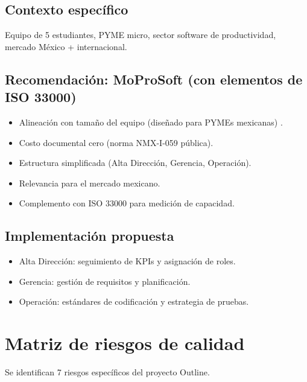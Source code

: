 \documentclass[12pt]{article}
\begin{document}
\subsection{Contexto específico}
Equipo de 5 estudiantes, PYME micro, sector software de productividad, mercado México + internacional.

\subsection{Recomendación: MoProSoft (con elementos de ISO 33000)}
\begin{itemize}
    \item Alineación con tamaño del equipo (diseñado para PYMEs mexicanas) \cite{oktaba2008}.
    \item Costo documental cero (norma NMX-I-059 pública).
    \item Estructura simplificada (Alta Dirección, Gerencia, Operación).
    \item Relevancia para el mercado mexicano.
    \item Complemento con ISO 33000 para medición de capacidad.
\end{itemize}

\subsection{Implementación propuesta}
\begin{itemize}
    \item Alta Dirección: seguimiento de KPIs y asignación de roles.
    \item Gerencia: gestión de requisitos y planificación.
    \item Operación: estándares de codificación y estrategia de pruebas.
\end{itemize}

\section{Matriz de riesgos de calidad}

Se identifican 7 riesgos específicos del proyecto Outline.
\end{document}
